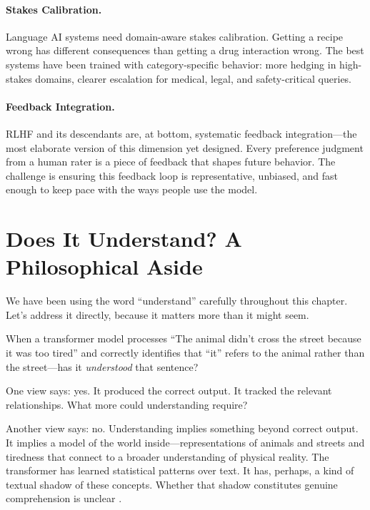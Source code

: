\paragraph{Stakes Calibration.} Language AI systems need domain-aware stakes calibration. Getting a recipe wrong has different consequences than getting a drug interaction wrong. The best systems have been trained with category-specific behavior: more hedging in high-stakes domains, clearer escalation for medical, legal, and safety-critical queries.

\paragraph{Feedback Integration.} RLHF and its descendants are, at bottom, systematic feedback integration---the most elaborate version of this dimension yet designed. Every preference judgment from a human rater is a piece of feedback that shapes future behavior. The challenge is ensuring this feedback loop is representative, unbiased, and fast enough to keep pace with the ways people use the model.

\section{Does It Understand? A Philosophical Aside}
\label{sec:does-it-understand}

We have been using the word ``understand'' carefully throughout this chapter. Let's address it directly, because it matters more than it might seem.

When a transformer model processes ``The animal didn't cross the street because it was too tired'' and correctly identifies that ``it'' refers to the animal rather than the street---has it \emph{understood} that sentence?

One view says: yes. It produced the correct output. It tracked the relevant relationships. What more could understanding require?

Another view says: no. Understanding implies something beyond correct output. It implies a model of the world inside---representations of animals and streets and tiredness that connect to a broader understanding of physical reality. The transformer has learned statistical patterns over text. It has, perhaps, a kind of textual shadow of these concepts. Whether that shadow constitutes genuine comprehension is unclear \autocite{searle1980minds, bender2021stochastic}.

